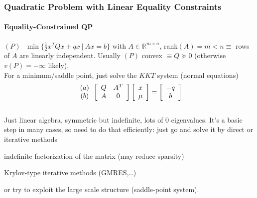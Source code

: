 \documentclass[10pt]{report}
\begin{document}
\subsubsection{Quadratic Problem with Linear Equality Constraints}
\paragraph{Equality-Constrained QP} $(P)\:\:\:\min\{\frac{1}{2}x^TQx+qx\:|\:Ax=b\}$ with $A\in \mathbb{R}^{m\times n}$, rank$(A)=m<n \equiv$ rows of $A$ are linearly independent. Usually $(P)$ convex $\equiv Q\succeq 0$ (otherwise $v(P)=-\infty$ likely).\\
For a minimum/saddle point, just solve the $KKT$ system (normal equations)
$$\begin{array}{c}
(a)\\(b)
\end{array}\left[\begin{array}{c c}
Q&A^T\\A&0
\end{array}\right]\left[\begin{array}{c}
x\\\mu
\end{array}\right]=\left[\begin{array}{c}
-q\\b
\end{array}\right]$$\\
Just linear algebra, symmetric but indefinite, lots of 0 eigenvalues. It's a basic step in many cases, so need to do that efficiently: just go and solve it by direct or iterative methods
\begin{list}{}{}
	\item indefinite factorization of the matrix (may reduce sparsity)
	\item Krylov-type iterative methods (GMRES,\ldots)
\end{list}
or try to exploit the large scale structure (saddle-point system).
\end{document}

